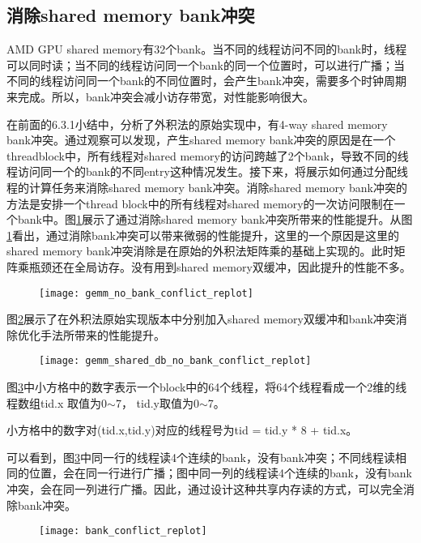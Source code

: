 \subsection{消除shared memory bank冲突}
AMD GPU shared memory有32个bank。当不同的线程访问不同的bank时，线程可以同时读；当不同的线程访问同一个bank的同一个位置时，可以进行广播；当不同的线程访问同一个bank的不同位置时，会产生bank冲突，需要多个时钟周期来完成。所以，bank冲突会减小访存带宽，对性能影响很大。

在前面的6.3.1小结中，分析了外积法的原始实现中，有4-way shared memory bank冲突。通过观察可以发现，产生shared memory bank冲突的原因是在一个threadblock中，所有线程对shared memory的访问跨越了2个bank，导致不同的线程访问同一个的bank的不同entry这种情况发生。接下来，将展示如何通过分配线程的计算任务来消除shared memory bank冲突。消除shared memory bank冲突的方法是安排一个thread block中的所有线程对shared memory的一次访问限制在一个bank中。图\ref{fig:gemm_no_bank_conflict_replot}展示了通过消除shared memory bank冲突所带来的性能提升。从图\ref{fig:gemm_no_bank_conflict_replot}看出，通过消除bank冲突可以带来微弱的性能提升，这里的一个原因是这里的shared memory bank冲突消除是在原始的外积法矩阵乘的基础上实现的。此时矩阵乘瓶颈还在全局访存。没有用到shared memory双缓冲，因此提升的性能不多。

\begin{figure}[htbp]
	\centering
	\texttt{[image: gemm\_no\_bank\_conflict\_replot]}
	\label{fig:gemm_no_bank_conflict_replot}
\end{figure}


图\ref{fig:gemm_shared_db_no_bank_conflict_replot}展示了在外积法原始实现版本中分别加入shared memory双缓冲和bank冲突消除优化手法所带来的性能提升。
\begin{figure}[htbp]
	\centering
	\texttt{[image: gemm\_shared\_db\_no\_bank\_conflict\_replot]}
	\label{fig:gemm_shared_db_no_bank_conflict_replot}
\end{figure}


图\ref{fig:bank_conflict_replot}中小方格中的数字表示一个block中的64个线程，将64个线程看成一个2维的线程数组tid.x 取值为0$\sim$7， tid.y取值为0$\sim$7。

小方格中的数字对(tid.x,tid.y)对应的线程号为tid = tid.y * 8 + tid.x。

可以看到，图\ref{fig:bank_conflict_replot}中同一行的线程读4个连续的bank，没有bank冲突；不同线程读相同的位置，会在同一行进行广播；图中同一列的线程读4个连续的bank，没有bank冲突，会在同一列进行广播。因此，通过设计这种共享内存读的方式，可以完全消除bank冲突。
\begin{figure}[htbp]
	\centering
	\texttt{[image: bank\_conflict\_replot]}
	\label{fig:bank_conflict_replot}
\end{figure}


